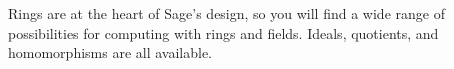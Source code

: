 Rings are at the heart of Sage's design, so you will find a wide range of possibilities for computing with rings and fields.  Ideals, quotients, and homomorphisms are all available.